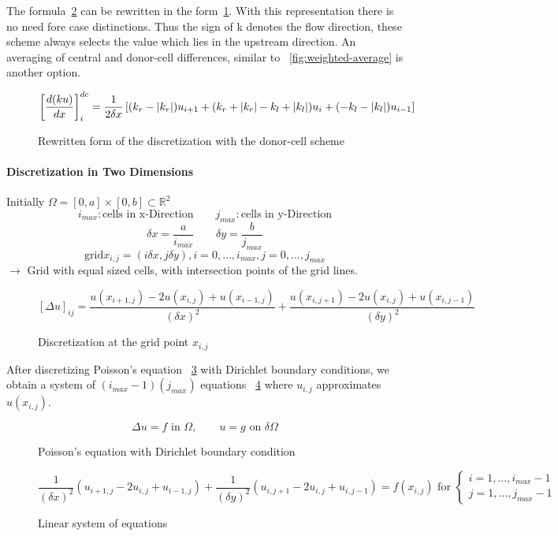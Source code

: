 \documentclass[a4paper,11pt]{scrartcl}
\DeclarePairedDelimiter\abs{\lvert}{\rvert}
\begin{document}
The formula~\ref{fig:dcs-method} can be rewritten in the form~\ref{fig:dcs-method-rewritten}. With this representation there is no need fore case distinctions. Thus the sign of k denotes the flow direction, these scheme always selects the value which lies in the upstream direction. An averaging of central and donor-cell differences, similar to ~\ref{fig:weighted-average} is another option.
\begin{figure}[H]
	\centering
	\[ \left[\frac{d(k u)}{d x}\right]^{dc}_i = \frac{1}{2 \delta x} \left[ (k_r - \abs{k_r}) u_{i+1} + (k_r + \abs{k_r}-k_l +\abs{k_l}) u_i  + (-k_l -\abs{k_l})u_{i-1} \right] \]
	\renewcommand{\thefigure}{3.12}
	\caption{Rewritten form of the discretization with the donor-cell scheme}
	\label{fig:dcs-method-rewritten}
\end{figure}

\paragraph{Discretization in Two Dimensions}
Initially $\Omega = [0,a] \times [0,b] \subset \mathds{R}^2$
\[i_{max} : \text{cells in x-Direction} \qquad j_{max} : \text{cells in y-Direction}\]
\[\delta x  = \frac{a}{i_{max}} \qquad \delta y = \frac{b}{j_{max}}\]
\[\text{grid} x_{i,j} = (i \delta x, j \delta y), i = 0, \dots, i_{max}, j = 0, \dots, j_{max} \]
$\rightarrow$ Grid with equal sized cells, with intersection points of the grid lines.

\begin{figure}[H]
	\centering
	\[ [\Delta u]_{ij} = \frac{u(x_{i+1,j}) - 2u(x_{i,j}) + u(x_{i-1,j})}{(\delta x)^2} + \frac{u(x_{i,j+1}) - 2u(x_{i,j}) + u(x_{i,j-1})}{(\delta y)^2}\]
	\renewcommand{\thefigure}{3.13}
	\caption{Discretization at the grid point $x_{i,j}$}
	\label{fig:dcs-method}
\end{figure}

After discretizing Poisson's equation ~\ref{fig:pe-dirich} with Dirichlet boundary conditions, we obtain  a system of $(i_{max}-1)(j_{max})$ equations ~\ref{fig:sys-of-eq} where $u_{i,j}$ approximates $u(x_{i,j})$.
\begin{figure}[H]
	\centering
	\[ \Delta u = f \text{ in } \Omega, \qquad u = g \text{ on } \delta\Omega\]
	\renewcommand{\thefigure}{3.14}
	\caption{Poisson's equation with Dirichlet boundary condition}
	\label{fig:pe-dirich}
\end{figure}

\begin{figure}[H]
	\centering
	\[ \frac{1}{(\delta x)^2} (u_{i+1,j} - 2u_{i,j} + u_{i-1,j}) + \frac{1}{(\delta y)^2} (u_{i,j+1} - 2u_{i,j} + u_{i,j-1}) = f(x_{i,j}) \text{ for } \begin{cases}
	i = 1, \dots, i_{max}-1 \\
	j = 1, \dots, j_{max}-1
\end{cases} \]
	\renewcommand{\thefigure}{3.15}
	\caption{Linear system of equations}
	\label{fig:sys-of-eq}
\end{figure}
\end{document}

